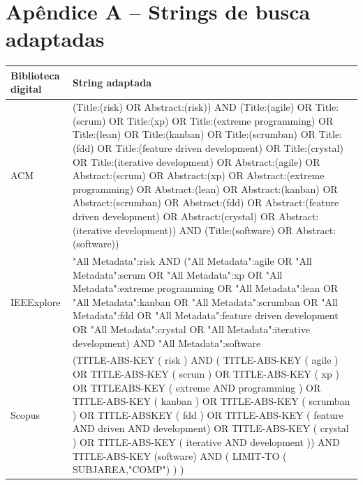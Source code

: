 \documentclass[
	12pt,
	openright,
	twoside,
	a4paper,
	english,
	brazil
	]{abntex2}
\begin{document}
\postextual


\appendix

\chapter*{Apêndice A – Strings de busca adaptadas}\label{apendiceA}

\vspace{-2em} %

\begin{table}[h!]
  \centering
  \begin{tabular}{|l|p{12cm}|}
    \hline
    \textbf{Biblioteca digital} & \textbf{String adaptada} \\
    \hline
    ACM & (Title:(risk) OR Abstract:(risk)) AND (Title:(agile) OR Title:(scrum) OR Title:(xp) OR Title:(extreme programming) OR Title:(lean) OR Title:(kanban) OR Title:(scrumban) OR Title:(fdd) OR Title:(feature driven development) OR Title:(crystal) OR Title:(iterative development) OR Abstract:(agile) OR Abstract:(scrum) OR Abstract:(xp) OR Abstract:(extreme programming) OR Abstract:(lean) OR Abstract:(kanban) OR Abstract:(scrumban) OR Abstract:(fdd) OR Abstract:(feature driven development) OR Abstract:(crystal) OR Abstract:(iterative development)) AND (Title:(software) OR Abstract:(software)) \\
    \hline
    IEEExplore & "All Metadata":risk AND ("All Metadata":agile OR "All Metadata":scrum OR "All Metadata":xp OR "All Metadata":extreme programming OR "All Metadata":lean OR "All Metadata":kanban OR "All Metadata":scrumban OR "All Metadata":fdd OR "All Metadata":feature driven development OR "All Metadata":crystal OR "All Metadata":iterative development) AND "All Metadata":software \\
    \hline
    Scopus & (TITLE-ABS-KEY ( risk ) AND ( TITLE-ABS-KEY ( agile ) OR TITLE-ABS-KEY ( scrum ) OR TITLE-ABS-KEY ( xp ) OR TITLEABS-KEY ( extreme AND programming ) OR TITLE-ABS-KEY ( kanban ) OR TITLE-ABS-KEY ( scrumban ) OR TITLE-ABSKEY ( fdd ) OR TITLE-ABS-KEY ( feature AND driven AND development) OR TITLE-ABS-KEY ( crystal ) OR TITLE-ABS-KEY ( iterative AND development )) AND TITLE-ABS-KEY (software) AND ( LIMIT-TO ( SUBJAREA,"COMP") ) ) \\
    \hline
  \end{tabular}
\end{table}
\end{document}
